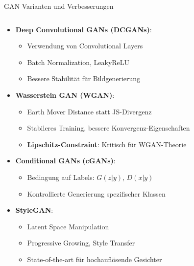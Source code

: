 \documentclass[aspectratio=1610, xcolor=dvipsnames, 9pt]{beamer}
\begin{document}
\begin{frame}{GAN Varianten und Verbesserungen}
  \begin{columns}
    \begin{column}{1\textwidth}
      \begin{itemize}
        \item \textbf{Deep Convolutional GANs (DCGANs)}:
        \begin{itemize}
          \item Verwendung von Convolutional Layers
          \item Batch Normalization, LeakyReLU
          \item Bessere Stabilität für Bildgenerierung
        \end{itemize}
        \item \textbf{Wasserstein GAN (WGAN)}:
        \begin{itemize}
          \item Earth Mover Distance statt JS-Divergenz
          \item Stabileres Training, bessere Konvergenz-Eigenschaften
          \item \textbf{Lipschitz-Constraint}: Kritisch für WGAN-Theorie
        \end{itemize}
        \item \textbf{Conditional GANs (cGANs)}:
        \begin{itemize}
          \item Bedingung auf Labels: $G(z|y)$, $D(x|y)$
          \item Kontrollierte Generierung spezifischer Klassen
        \end{itemize}
        \item \textbf{StyleGAN}:
        \begin{itemize}
          \item Latent Space Manipulation
          \item Progressive Growing, Style Transfer
          \item State-of-the-art für hochauflösende Gesichter
        \end{itemize}
      \end{itemize}
    \end{column}
  \end{columns}
\end{frame}
\end{document}
